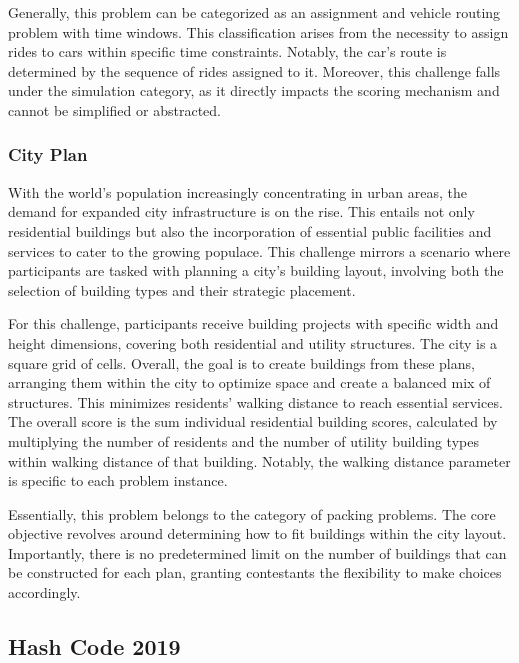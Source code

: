 Generally, this problem can be categorized as an assignment and vehicle routing
problem with time windows. This classification arises from the necessity to
assign rides to cars within specific time constraints. Notably, the car's route
is determined by the sequence of rides assigned to it. Moreover, this challenge
falls under the simulation category, as it directly impacts the scoring
mechanism and cannot be simplified or abstracted.

\subsubsection*{City Plan}
\label{subsubsec:hashcode-2018-final}

With the world's population increasingly concentrating in urban areas, the
demand for expanded city infrastructure is on the rise. This entails not only
residential buildings but also the incorporation of essential public facilities
and services to cater to the growing populace. This challenge mirrors a scenario
where participants are tasked with planning a city's building layout,
involving both the selection of building types and their strategic placement.

For this challenge, participants receive building projects with specific width and
height dimensions, covering both residential and utility structures. The city is
a square grid of cells. Overall, the goal is to create buildings from these
plans, arranging them within the city to optimize space and create a balanced
mix of structures. This minimizes residents' walking distance to reach essential
services. The overall score is the sum individual residential building scores,
calculated by multiplying the number of residents and the number of utility
building types within walking distance of that building. Notably, the walking
distance parameter is specific to each problem instance.

Essentially, this problem belongs to the category of packing problems. The core
objective revolves around determining how to fit buildings within the city
layout. Importantly, there is no predetermined limit on the number of buildings
that can be constructed for each plan, granting contestants the flexibility to
make choices accordingly.

\subsection{Hash Code 2019}
\label{subsec:hashcode-2019}

